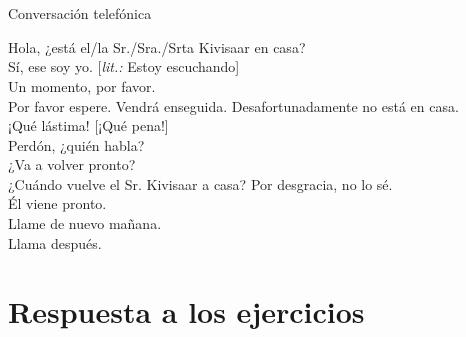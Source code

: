  \\ \medskip

\noindent
{} \\
  \\
 \\
 \\
 \\
 \\
 \\
 \\
 \\
 \\
 \\ \bigskip

Conversación telefónica \\ \medskip

\noindent
Hola, ¿está el/la Sr./Sra./Srta Kivisaar en casa? \\
Sí, ese soy yo. [\emph{lit.:} Estoy escuchando] \\
Un momento, por favor. \\
Por favor espere. Vendrá enseguida. Desafortunadamente no está en casa. \\
¡Qué lástima! [¡Qué pena!] \\
Perdón, ¿quién habla? \\
¿Va a volver pronto? \\
¿Cuándo vuelve el Sr. Kivisaar a casa? Por desgracia, no lo sé. \\
Él viene pronto. \\
Llame de nuevo mañana. \\
Llama después.

\bigskip
\Large{\section*{Respuesta a los ejercicios}}

